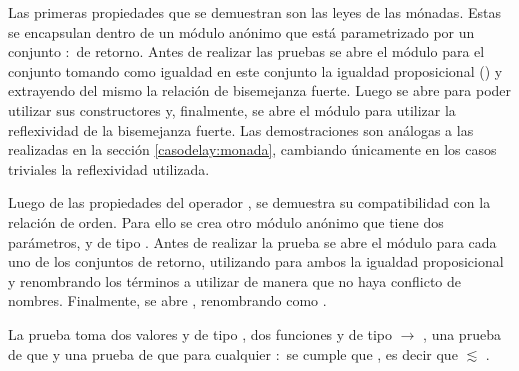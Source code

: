 \begin{AgdaAlign}

Las primeras propiedades que se demuestran son las leyes de las mónadas. Estas se encapsulan dentro de un módulo anónimo que está parametrizado por un conjunto  $:$  de retorno. Antes de realizar las pruebas se abre el módulo   para el conjunto  tomando como igualdad en este conjunto la igualdad proposicional (\AgdaFunction{\_$\equiv$\_}) y extrayendo del mismo la relación de bisemejanza fuerte. Luego se abre  para poder utilizar sus constructores y, finalmente, se abre el módulo  para utilizar la reflexividad de la bisemejanza fuerte. Las demostraciones son análogas a las realizadas en la sección \ref{casodelay:monada}, cambiando únicamente en los casos triviales la reflexividad utilizada. 


Luego de las propiedades del operador , se demuestra su compatibilidad con la relación de orden. Para ello se crea otro módulo anónimo que tiene dos parámetros,  y  de tipo . Antes de realizar la prueba se abre el módulo  para cada uno de los conjuntos de retorno, utilizando para ambos la igualdad proposicional y renombrando los términos a utilizar de manera que no haya conflicto de nombres. Finalmente, se abre , renombrando  como . 


La prueba toma dos valores  y  de tipo  \AgdaDatatype{$\bot$}, dos funciones  y  de tipo  $\rightarrow$  \AgdaDatatype{$\bot$}, una prueba de que    y una prueba de que para cualquier  $:$  se cumple que   , es decir que  $\lesssim$ . 


\end{AgdaAlign}

